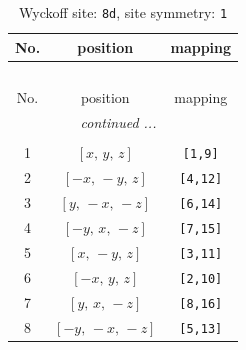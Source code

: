 \documentclass[fleqn,8pt]{jsarticle}
\begin{document}
\renewcommand{\arraystretch}{1.2}
\begin{longtable}{ccc}
\caption{Wyckoff site: {\tt 8d}, site symmetry: {\tt 1}}
 \\
 \hline \hline
No. & position & mapping \\ \hline \endfirsthead

\multicolumn{2}{l}{\tablename\ \thetable{}} \\
 \hline \hline
No. & position & mapping \\ \hline \endhead

 \hline \hline
\multicolumn{2}{r}{\footnotesize\it continued ...} \\ \endfoot

 \hline \hline
\multicolumn{2}{r}{} \\ \endlastfoot

1 & $\left[ x,\, y,\, z \right]$ & {\tt [1,9]} \\ \hline
2 & $\left[ - x,\, - y,\, z \right]$ & {\tt [4,12]} \\ \hline
3 & $\left[ y,\, - x,\, - z \right]$ & {\tt [6,14]} \\ \hline
4 & $\left[ - y,\, x,\, - z \right]$ & {\tt [7,15]} \\ \hline
5 & $\left[ x,\, - y,\, z \right]$ & {\tt [3,11]} \\ \hline
6 & $\left[ - x,\, y,\, z \right]$ & {\tt [2,10]} \\ \hline
7 & $\left[ y,\, x,\, - z \right]$ & {\tt [8,16]} \\ \hline
8 & $\left[ - y,\, - x,\, - z \right]$ & {\tt [5,13]} \\
\end{longtable}
\end{document}
